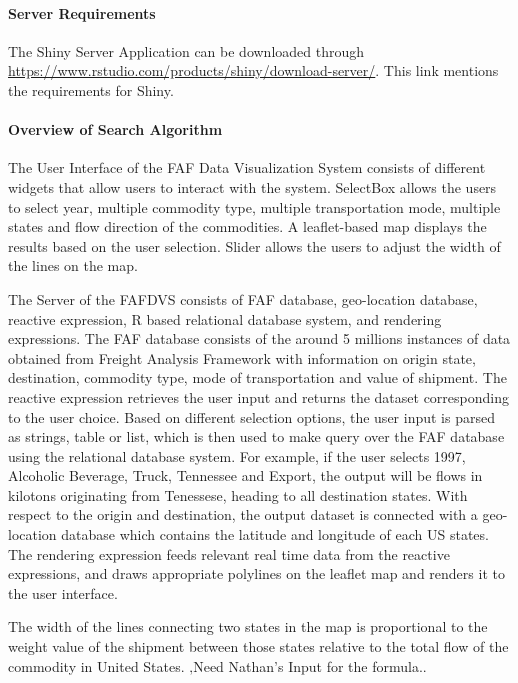 \documentclass[12pt]{article}
\begin{document}
\paragraph*{Server Requirements}

The Shiny Server Application can be downloaded through \url{https://www.rstudio.com/products/shiny/download-server/}.  This link mentions the requirements for Shiny.

\paragraph*{Overview of Search Algorithm}

The User Interface of the FAF Data Visualization System consists of different widgets that allow users to interact with the system. SelectBox allows the users to select year, multiple commodity type, multiple transportation mode, multiple states and flow direction of the commodities.  A leaflet-based map displays the results based on the user selection. Slider allows the users to adjust the width of the lines on the map.  

The Server of the FAFDVS consists of FAF database, geo-location database, reactive expression, R based relational database system, and rendering expressions. The FAF database consists of the around 5 millions instances of data obtained from Freight Analysis Framework with information on origin state, destination, commodity type, mode of transportation and value of shipment. The reactive expression retrieves the user input and returns the dataset corresponding to the user choice. Based on different selection options, the user input is parsed as strings, table or list, which is then used to make query over the FAF database using the relational database system.  For example, if the user selects 1997, Alcoholic Beverage, Truck, Tennessee and Export, the output will be flows in kilotons originating from Tenessese, heading to all destination states. With respect to the origin and destination, the output dataset is connected with a geo-location database which contains the latitude and longitude of each US states.  The rendering expression feeds relevant real time data from the reactive expressions, and draws appropriate polylines on the leaflet map and renders it to the user interface.  

The width of the lines connecting two states in the map is proportional to the weight value of the shipment between those states relative to the total flow of the commodity in United States.  ‚Need Nathan's Input for the formula..
\end{document}
